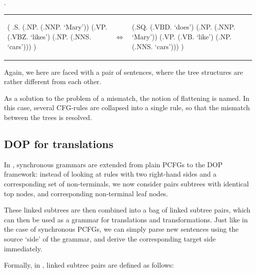 \documentclass[a4paper]{article}
\theoremstyle{definition}
\begin{document}
\ex. \label{marylike}

\begin{tabular}{lll}
\begin{parsetree}
( .S.
    (.NP. (.NNP. `Mary'))
    (.VP. (.VBZ. `likes')
      (.NP. (.NNS. `cars')))
)
\end{parsetree}
& $\iff$ &
\begin{parsetree}
  (.SQ. (.VBD. `does')
    (.NP. (.NNP. `Mary'))
    (.VP. (.VB. `like')
      (.NP. (.NNS. `cars')))
    )
\end{parsetree}
\end{tabular}
\vspace{1em}

Again, we here are faced with a pair of sentences, where the tree structures
are rather different from each other.

As a solution to the problem of a mismatch, the notion of flattening is named.
In this case, several CFG-rules are collapsed into a single rule, so that the
mismatch between the trees is resolved.

\subsection{DOP for translations}

In \citet{poutsma2000msc, poutsma2000coling}, synchronous grammars are extended
from plain PCFGs to the DOP framework: instead of looking at rules with two
right-hand sides and a corresponding set of non-terminals, we now consider
pairs subtrees with identical top nodes, and corresponding non-terminal leaf
nodes.

These linked subtrees are then combined into a bag of linked subtree pairs,
which can then be used as a grammar for translations and transformations. Just
like in the case of synchronous PCFGs, we can simply parse new sentences using
the source `side' of the grammar, and derive the corresponding target side
immediately.

Formally, in \citet{poutsma2000coling}, linked subtree pairs are defined as follows:
\end{document}

